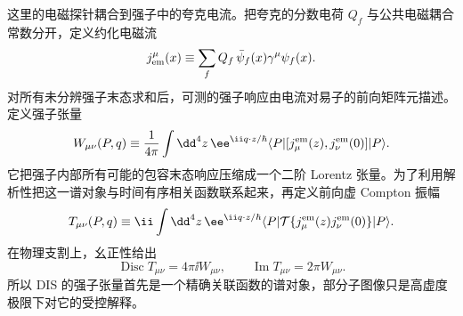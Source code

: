这里的电磁探针耦合到强子中的夸克电流。把夸克的分数电荷 $Q_f$ 与公共电磁耦合常数分开，定义约化电磁流
\begin{equation*}
 j_{\rm em}^\mu(x)
 \equiv\sum_f Q_f\,\bar\psi_f(x)\gamma^\mu\psi_f(x).
\end{equation*}
对所有未分辨强子末态求和后，可测的强子响应由电流对易子的前向矩阵元描述。定义强子张量
\begin{equation*}
 W_{\mu\nu}(P,q)
 \equiv\frac1{4\pi}
 \int\dd^4 z\,
 \ee^{\ii q\cdot z/\hbar}
 \langle P|[j^{\rm em}_\mu(z),j^{\rm em}_\nu(0)]|P\rangle.
\end{equation*}
它把强子内部所有可能的包容末态响应压缩成一个二阶 Lorentz 张量。为了利用解析性把这一谱对象与时间有序相关函数联系起来，再定义前向虚 Compton 振幅
\begin{equation*}
 T_{\mu\nu}(P,q)
 \equiv\ii\int\dd^4 z\,
 \ee^{\ii q\cdot z/\hbar}
 \langle P|\mathcal T\{j^{\rm em}_\mu(z)j^{\rm em}_\nu(0)\}|P\rangle.
\end{equation*}
在物理支割上，幺正性给出
\begin{equation}
 {
 \operatorname{Disc}T_{\mu\nu}=4\pi\ii W_{\mu\nu},
 \qquad
 \operatorname{Im}T_{\mu\nu}=2\pi W_{\mu\nu}.}
 \label{eq:dis-optical-theorem-dp13}
\end{equation}
所以 DIS 的强子张量首先是一个精确关联函数的谱对象，部分子图像只是高虚度极限下对它的受控解释。


